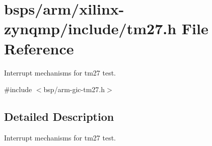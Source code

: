 \hypertarget{arm_2xilinx-zynqmp_2include_2tm27_8h}{}\section{bsps/arm/xilinx-\/zynqmp/include/tm27.h File Reference}
\label{arm_2xilinx-zynqmp_2include_2tm27_8h}


Interrupt mechanisms for tm27 test.  


{\ttfamily \#include $<$bsp/arm-\/gic-\/tm27.\+h$>$}\newline


\subsection{Detailed Description}
Interrupt mechanisms for tm27 test. 

